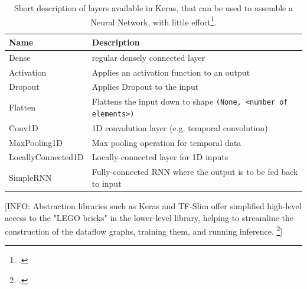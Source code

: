 \begin{table}[h!]
	\begin{center}
		\begin{tabular}{| l | l |}
			\hline
			\bfseries Name & \bfseries Description \\
			\hline
			Dense & regular densely connected layer \\
			\hline
			Activation & Applies an activation function to an output \\
			\hline
			Dropout & Applies Dropout to the input \\
			\hline
			Flatten & Flattens the input down to shape \verb|(None, <number of elements>)| \\
			\hline
			Conv1D & 1D convolution layer (e.g. temporal convolution)  \\
			\hline
			MaxPooling1D & Max pooling operation for temporal data \\
			\hline
			LocallyConnected1D & Locally-connected layer for 1D inputs \\
			\hline
			SimpleRNN & Fully-connected RNN where the output is to be fed back to input \\
			\hline
		\end{tabular}
		\label{tab:methodology_tensorflow_alternativesToTensorflow_kerasLayers}
		\caption{Short description of layers available in Keras, that can be used to assemble a Neural Network, with little effort\footcite{kerasDocumentation}.}
	\end{center}
\end{table}


[INFO: Abstraction libraries such as Keras and TF-Slim offer simplified  high-level  access  to  the  "LEGO  bricks"  in  the  lower-level  library,  helping  to streamline the construction of the dataflow graphs, training them, and running inference. \footcite[page 7]{Hope_Learning_TensorFlow}]

